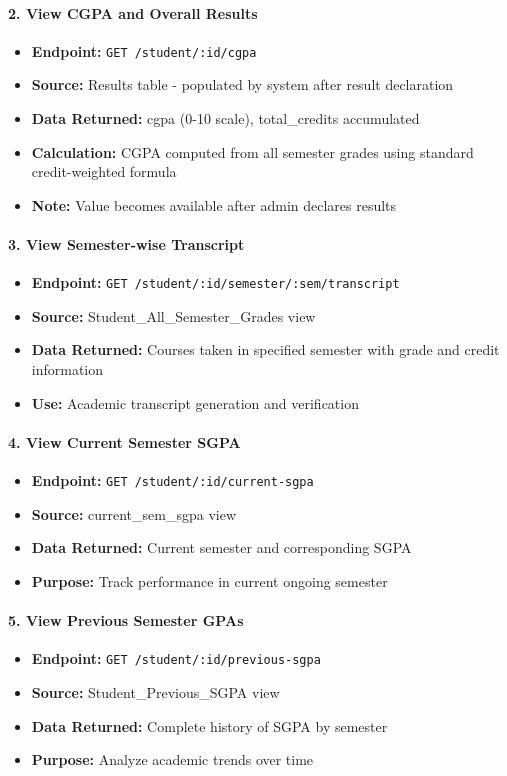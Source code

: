 \documentclass[12pt]{article}
\begin{document}
\paragraph{2. View CGPA and Overall Results}
\begin{itemize}
    \item \textbf{Endpoint:} \texttt{GET /student/:id/cgpa}
    \item \textbf{Source:} Results table - populated by system after result declaration
    \item \textbf{Data Returned:} cgpa (0-10 scale), total\_credits accumulated
    \item \textbf{Calculation:} CGPA computed from all semester grades using standard credit-weighted formula
    \item \textbf{Note:} Value becomes available after admin declares results
\end{itemize}

\paragraph{3. View Semester-wise Transcript}
\begin{itemize}
    \item \textbf{Endpoint:} \texttt{GET /student/:id/semester/:sem/transcript}
    \item \textbf{Source:} Student\_All\_Semester\_Grades view
    \item \textbf{Data Returned:} Courses taken in specified semester with grade and credit information
    \item \textbf{Use:} Academic transcript generation and verification
\end{itemize}

\paragraph{4. View Current Semester SGPA}
\begin{itemize}
    \item \textbf{Endpoint:} \texttt{GET /student/:id/current-sgpa}
    \item \textbf{Source:} current\_sem\_sgpa view
    \item \textbf{Data Returned:} Current semester and corresponding SGPA
    \item \textbf{Purpose:} Track performance in current ongoing semester
\end{itemize}

\paragraph{5. View Previous Semester GPAs}
\begin{itemize}
    \item \textbf{Endpoint:} \texttt{GET /student/:id/previous-sgpa}
    \item \textbf{Source:} Student\_Previous\_SGPA view
    \item \textbf{Data Returned:} Complete history of SGPA by semester
    \item \textbf{Purpose:} Analyze academic trends over time
\end{itemize}
\end{document}
